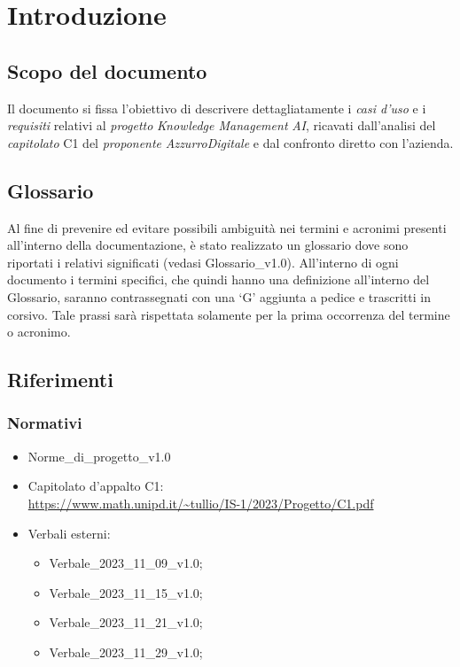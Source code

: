 \chapter{Introduzione} \label{cap:intro}
\section{Scopo del documento}
Il documento si fissa l'obiettivo di descrivere dettagliatamente i \emph{casi d’uso} e i \emph{requisiti} relativi al \emph{progetto} \emph{Knowledge Management} \emph{AI}, ricavati dall’analisi del \emph{capitolato} C1 del \emph{proponente} \emph{AzzurroDigitale} e dal confronto diretto con l'azienda.
\section{Glossario}
Al fine di prevenire ed evitare possibili ambiguità nei termini e acronimi presenti all’interno della documentazione, è stato realizzato un glossario dove sono riportati i relativi significati (vedasi Glossario\_v1.0). All’interno di ogni documento i termini specifici, che quindi hanno una definizione all’interno del Glossario, saranno contrassegnati con una ‘G’ aggiunta a pedice e trascritti in corsivo. Tale prassi sarà rispettata solamente per la prima occorrenza del termine o acronimo.
\section{Riferimenti}
\subsection{Normativi}
\begin{itemize}
    \item Norme\_di\_progetto\_v1.0
    \item Capitolato d'appalto C1: \\ \url{https://www.math.unipd.it/~tullio/IS-1/2023/Progetto/C1.pdf}
    \item Verbali esterni:
        \begin{itemize}
            \item Verbale\_2023\_11\_09\_v1.0;
            \item Verbale\_2023\_11\_15\_v1.0;
            \item Verbale\_2023\_11\_21\_v1.0;
            \item Verbale\_2023\_11\_29\_v1.0;
        \end{itemize}
\end{itemize}

